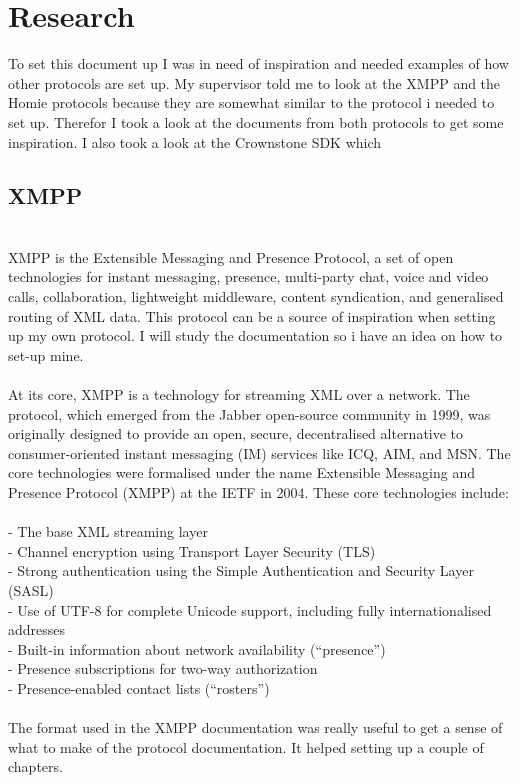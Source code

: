 \documentclass{article}
\begin{document}
\cleardoublepage
\section{Research}\label{sec:research} 
To set this document up I was in need of inspiration and needed examples of how other protocols are set up. My supervisor told me to look at the XMPP and the Homie protocols because they are somewhat similar to the protocol i needed to set up. Therefor I took a look at the documents from both protocols to get some inspiration. I also took a look at the Crownstone SDK which 
\\
\subsection{XMPP}\label{sec:xmpp} 
\\
XMPP is the Extensible Messaging and Presence Protocol, a set of open technologies for instant messaging, presence, multi-party chat, voice and video calls, collaboration, lightweight middleware, content syndication, and generalised routing of XML data. This protocol can be a source of inspiration when setting up my own protocol. I will study the documentation so i have an idea on how to set-up mine.\\
\\
At its core, XMPP is a technology for streaming XML over a network. The protocol, which emerged from the Jabber open-source community in 1999, was originally designed to provide an open, secure, decentralised alternative to consumer-oriented instant messaging (IM) services like ICQ, AIM, and MSN. The core technologies were formalised under the name Extensible Messaging and Presence Protocol (XMPP) at the IETF in 2004. These core technologies include:\\
\\
- The base XML streaming layer\\
- Channel encryption using Transport Layer Security (TLS)\\
- Strong authentication using the Simple Authentication and Security Layer (SASL)\\
- Use of UTF-8 for complete Unicode support, including fully internationalised addresses\\
- Built-in information about network availability (“presence”)\\
- Presence subscriptions for two-way authorization\\
- Presence-enabled contact lists (“rosters”)\\
\\
The format used in the XMPP documentation was really useful to get a sense of what to make of the protocol documentation. It helped setting up a couple of chapters. 
\end{document}
